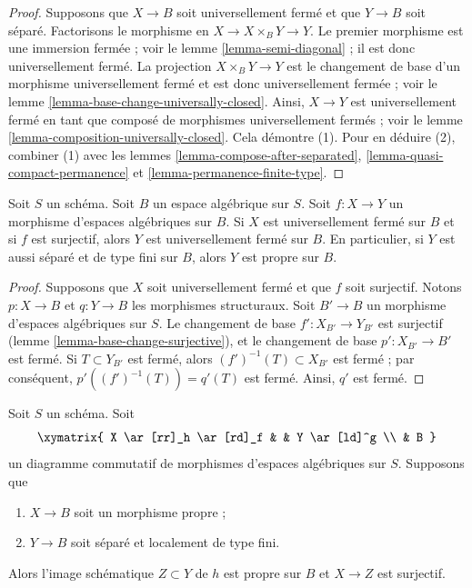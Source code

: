 \begin{proof}
Supposons que $X \to B$ soit universellement fermé et que $Y \to B$ soit séparé.
Factorisons le morphisme en $X \to X \times_B Y \to Y$.
Le premier morphisme est une immersion fermée ; voir le
lemme \ref{lemma-semi-diagonal} ;
il est donc universellement fermé.
La projection $X \times_B Y \to Y$ est le changement de base
d'un morphisme universellement fermé et est donc
universellement fermée ; voir le
lemme \ref{lemma-base-change-universally-closed}.
Ainsi, $X \to Y$ est universellement fermé en tant que composé
de morphismes universellement fermés ; voir le
lemme \ref{lemma-composition-universally-closed}.
Cela démontre (1). Pour en déduire (2), combiner (1) avec les
lemmes \ref{lemma-compose-after-separated},
\ref{lemma-quasi-compact-permanence} et
\ref{lemma-permanence-finite-type}.
\end{proof}

\begin{lemma}
\label{lemma-image-proper-is-proper}
Soit $S$ un schéma. Soit $B$ un espace algébrique sur $S$.
Soit $f : X \to Y$ un morphisme d'espaces algébriques sur $B$.
Si $X$ est universellement fermé sur $B$ et si $f$ est surjectif, alors
$Y$ est universellement fermé sur $B$. En particulier, si $Y$ est aussi
séparé et de type fini sur $B$, alors $Y$ est propre sur $B$.
\end{lemma}

\begin{proof}
Supposons que $X$ soit universellement fermé et que $f$ soit surjectif.
Notons $p : X \to B$ et $q : Y \to B$ les morphismes structuraux.
Soit $B' \to B$ un morphisme d'espaces algébriques sur $S$.
Le changement de base $f' : X_{B'} \to Y_{B'}$ est surjectif
(lemme \ref{lemma-base-change-surjective}), et le changement de
base $p' : X_{B'} \to B'$ est fermé.
Si $T \subset Y_{B'}$ est fermé, alors $(f')^{-1}(T) \subset X_{B'}$
est fermé ; par conséquent, $p'((f')^{-1}(T)) = q'(T)$ est fermé.
Ainsi, $q'$ est fermé.
\end{proof}

\begin{lemma}
\label{lemma-scheme-theoretic-image-is-proper}
Soit $S$ un schéma. Soit
$$
\xymatrix{
X \ar[rr]_h \ar[rd]_f & & Y \ar[ld]^g \\
& B
}
$$
un diagramme commutatif de morphismes d'espaces algébriques sur $S$.
Supposons que
\begin{enumerate}
\item $X \to B$ soit un morphisme propre ;
\item $Y \to B$ soit séparé et localement de type fini.
\end{enumerate}
Alors l'image schématique $Z \subset Y$ de $h$
est propre sur $B$ et $X \to Z$ est surjectif.
\end{lemma}


